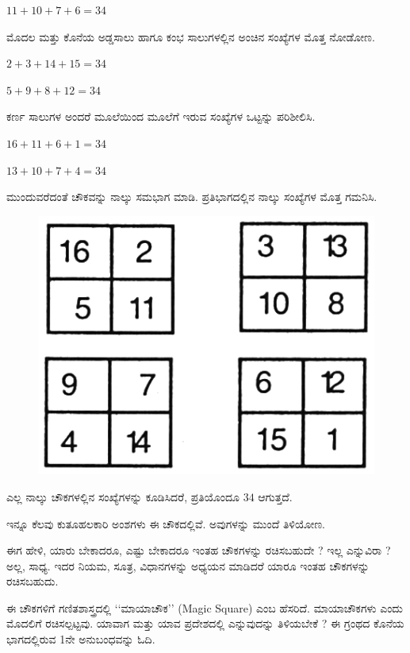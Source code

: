$11+10+7+6 = 34$

ಮೊದಲ ಮತ್ತು ಕೊನೆಯ ಅಡ್ಡಸಾಲು ಹಾಗೂ ಕಂಭ ಸಾಲುಗಳಲ್ಲಿನ ಅಂಚಿನ ಸಂಖ್ಯೆಗಳ ಮೊತ್ತ ನೋಡೋಣ.

$2+3+14+15 = 34$

$5+9+8+12 = 34$

ಕರ್ಣ ಸಾಲುಗಳ ಅಂದರೆ ಮೂಲೆಯಿಂದ ಮೂಲೆಗೆ ಇರುವ ಸಂಖ್ಯೆಗಳ ಒಟ್ಟನ್ನು ಪರಿಶೀಲಿಸಿ.

$16+11+6+1 = 34$

$13+10+7+4 = 34$

ಮುಂದುವರೆದಂತೆ ಚೌಕವನ್ನು ನಾಲ್ಕು ಸಮಭಾಗ ಮಾಡಿ. ಪ್ರತಿಭಾಗದಲ್ಲಿನ ನಾಲ್ಕು ಸಂಖ್ಯೆಗಳ ಮೊತ್ತ ಗಮನಿಸಿ.
\begin{figure}[H]
\includegraphics{src/figures/chap1/fig1.2.jpg}
\end{figure}
ಎಲ್ಲ ನಾಲ್ಕು ಚೌಕಗಳಲ್ಲಿನ ಸಂಖ್ಯೆಗಳನ್ನು ಕೂಡಿಸಿದರೆ, ಪ್ರತಿಯೊಂದೂ $34$ ಆಗುತ್ತದೆ.

ಇನ್ನೂ ಕೆಲವು ಕುತೂಹಲಕಾರಿ ಅಂಶಗಳು ಈ ಚೌಕದಲ್ಲಿವೆ. ಅವುಗಳನ್ನು ಮುಂದೆ ತಿಳಿಯೋಣ.

ಈಗ ಹೇಳಿ, ಯಾರು ಬೇಕಾದರೂ, ಎಷ್ಟು ಬೇಕಾದರೂ ಇಂತಹ ಚೌಕಗಳನ್ನು ರಚಿಸಬಹುದೇ ? ಇಲ್ಲ ಎನ್ನುವಿರಾ ? ಅಲ್ಲ, ಸಾಧ್ಯ. ಇದರ ನಿಯಮ, ಸೂತ್ರ, ವಿಧಾನಗಳನ್ನು ಅಧ್ಯಯನ ಮಾಡಿದರೆ ಯಾರೂ ಇಂತಹ ಚೌಕಗಳನ್ನು ರಚಿಸಬಹುದು.

ಈ ಚೌಕಗಳಿಗೆ ಗಣಿತಶಾಸ್ತ್ರದಲ್ಲಿ ‘‘ಮಾಯಾಚೌಕ’’ (Magic Square) ಎಂಬ ಹೆಸರಿದೆ. ಮಾಯಾಚೌಕಗಳು ಎಂದು ಮೊದಲಿಗೆ ರಚಿಸಲ್ಪಟ್ಟವು. ಯಾವಾಗ ಮತ್ತು ಯಾವ ಪ್ರದೇಶದಲ್ಲಿ ಎನ್ನುವುದನ್ನು ತಿಳಿಯಬೇಕೆ ? ಈ ಗ್ರಂಥದ ಕೊನೆಯ ಭಾಗದಲ್ಲಿರುವ 1ನೇ ಅನುಬಂಧವನ್ನು ಓದಿ.
